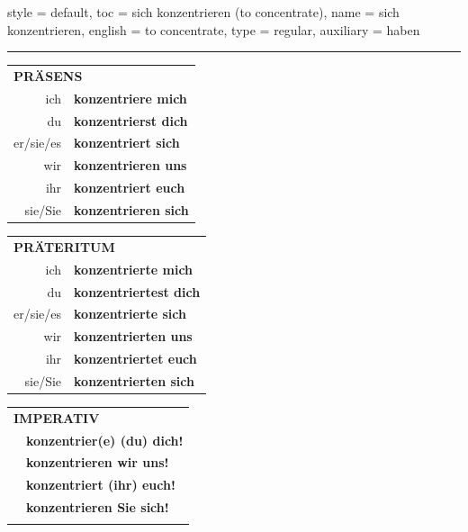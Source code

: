 \begin{verbentry}{
  style = {default},
  toc = {sich konzentrieren (to concentrate)},
  name = {sich konzentrieren},
  english = {to concentrate},
  type = {regular},
  auxiliary = {haben}
}
 
    
       \vspace{5pt}

    \hrule
    
    \vspace{5pt}

  \begin{tabular}{rl}
     \multicolumn{2}{l}{\textbf{PRÄSENS} }\\
    ich & \textbf{konzentriere mich}\\
    du & \textbf{konzentrierst dich}\\
    er/sie/es & \textbf{konzentriert sich}\\
    wir & \textbf{konzentrieren uns}\\
    ihr & \textbf{konzentriert euch}\\
    sie/Sie & \textbf{konzentrieren sich}\\
  \end{tabular}
  \hfill
     \begin{tabular}{rl}
    \multicolumn{2}{l}{\textbf{PRÄTERITUM} }\\
    ich & \textbf{konzentrierte mich}\\
    du & \textbf{konzentriertest dich}\\
    er/sie/es & \textbf{konzentrierte sich}\\
    wir & \textbf{konzentrierten uns}\\
    ihr & \textbf{konzentriertet euch}\\
    sie/Sie & \textbf{konzentrierten sich}\\
  \end{tabular}
  \hfill
  \begin{tabular}{rl}
     \multicolumn{2}{l}{\textbf{IMPERATIV} }\\
   & \textbf{konzentrier(e) (du) dich!}\\
   & \textbf{konzentrieren wir uns!}\\
   & \textbf{konzentriert (ihr) euch!}\\
   & \textbf{konzentrieren Sie sich!}\\
   & \vspace{10pt}
  \end{tabular}


\end{verbentry}
